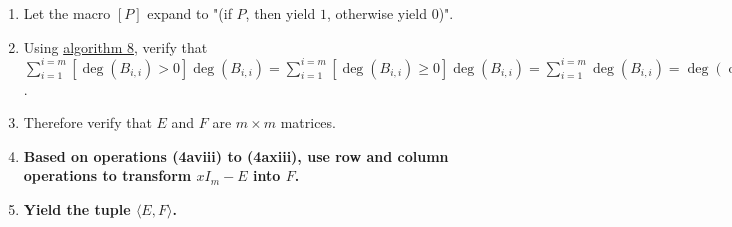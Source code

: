 \documentclass[twocolumn]{article}
\begin{document}
\begin{enumerate}
\begin{enumerate}
\begin{enumerate}
						\item Verify that $D$ is now a diagonal matrix whose first $k-1$ diagonal entries are $1$ and whose last diagonal entry is $p$.
						\item Add $k$ columns filled with zeros to the right end of $F$.
						\item Add k rows filled with zeros to the bottom end of $F$.
						\item Set the bottom-right corner of $F$ equal to $D$.
					\end{enumerate}
					\item Otherwise if $k=0$, then do the following:
					\begin{enumerate}
						\item Verify that $p$ is monic.
						\item Verify that $p=1$.
					\end{enumerate}
				\end{enumerate}
				\item Let the macro $[P]$ expand to "(if $P$, then yield $1$, otherwise yield $0$)".
				\item Using \hyperref[sec:algorithm 8]{algorithm 8}, verify that $\sum_{i=1}^{i=m}[\deg(B_{i,i})>0]\deg(B_{i,i})=\sum_{i=1}^{i=m}[\deg(B_{i,i})\ge 0]\deg(B_{i,i})=\sum_{i=1}^{i=m}\deg(B_{i,i})=\deg(\det(B))=\deg(\det(xI_m-A))=m$.
				\item Therefore verify that $E$ and $F$ are $m\times m$ matrices.
				\item \textbf{Based on operations (4aviii) to (4axiii), use row and column operations to transform $xI_m-E$ into $F$.}
				\item \textbf{Yield the tuple $\langle E, F\rangle$.}
			\end{enumerate}
\end{document}
